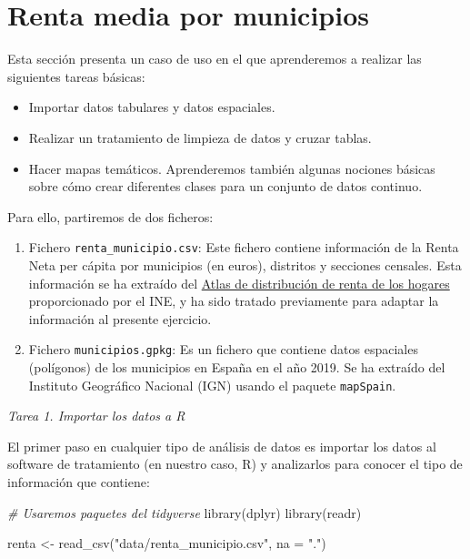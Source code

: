 \documentclass[
]{report}
\newenvironment{Shaded}{\begin{snugshade}}{\end{snugshade}}
\newcommand{\AttributeTok}[1]{\textcolor[rgb]{0.77,0.63,0.00}{#1}}
\newcommand{\CommentTok}[1]{\textcolor[rgb]{0.56,0.35,0.01}{\textit{#1}}}
\newcommand{\FunctionTok}[1]{\textcolor[rgb]{0.00,0.00,0.00}{#1}}
\newcommand{\NormalTok}[1]{#1}
\newcommand{\OtherTok}[1]{\textcolor[rgb]{0.56,0.35,0.01}{#1}}
\newcommand{\StringTok}[1]{\textcolor[rgb]{0.31,0.60,0.02}{#1}}
\theoremstyle{definition}
\theoremstyle{definition}
\theoremstyle{definition}
\theoremstyle{definition}
\theoremstyle{remark}
\begin{document}
\hypertarget{renta-media-por-municipios}{%
\section{Renta media por municipios}\label{renta-media-por-municipios}}

Esta sección presenta un caso de uso en el que aprenderemos a realizar las
siguientes tareas básicas:

\begin{itemize}
\item
  Importar datos tabulares y datos espaciales.
\item
  Realizar un tratamiento de limpieza de datos y cruzar tablas.
\item
  Hacer mapas temáticos. Aprenderemos también algunas nociones básicas sobre
  cómo crear diferentes clases para un conjunto de datos continuo.
\end{itemize}

Para ello, partiremos de dos ficheros:

\begin{enumerate}
\def\labelenumi{\arabic{enumi}.}
\item
  Fichero \texttt{renta\_municipio.csv}: Este fichero contiene información de la Renta
  Neta per cápita por municipios (en euros), distritos y secciones censales.
  Esta información se ha extraído del \href{https://www.ine.es/experimental/atlas/experimental_atlas.htm}{Atlas de distribución de renta de los
  hogares}
  proporcionado por el INE, y ha sido tratado previamente para adaptar la
  información al presente ejercicio.
\item
  Fichero \texttt{municipios.gpkg}: Es un fichero que contiene datos espaciales
  (polígonos) de los municipios en España en el año 2019. Se ha extraído del
  Instituto Geográfico Nacional (IGN) usando el paquete \texttt{mapSpain}.
\end{enumerate}

\emph{Tarea 1. Importar los datos a R}

El primer paso en cualquier tipo de análisis de datos es importar los datos al
software de tratamiento (en nuestro caso, R) y analizarlos para conocer el tipo
de información que contiene:

\begin{Shaded}
\begin{Highlighting}[]
\CommentTok{\# Usaremos paquetes del tidyverse}
\FunctionTok{library}\NormalTok{(dplyr)}
\FunctionTok{library}\NormalTok{(readr)}

\NormalTok{renta }\OtherTok{\textless{}{-}} \FunctionTok{read\_csv}\NormalTok{(}\StringTok{"data/renta\_municipio.csv"}\NormalTok{, }\AttributeTok{na =} \StringTok{"."}\NormalTok{)}
\end{Highlighting}
\end{Shaded}
\end{document}
